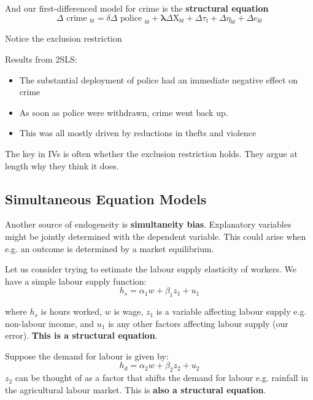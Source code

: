 \documentclass[11pt]{article}
\begin{document}
\begin{example}
And our first-differenced model for crime is the \textbf{structural equation}
\begin{equation}
\Delta \text { crime }_{b t}=\delta \Delta \text { police }_{b t}+\boldsymbol{\lambda} \Delta \mathrm{X}_{b t}+\Delta \tau_t+\Delta \eta_{b t}+\Delta e_{b t}
\end{equation}
\begin{note}
    Notice the exclusion restriction
\end{note}

Results from 2SLS:

\begin{itemize}
    \item The substantial deployment of police had an immediate negative effect on crime
    \item As soon as police were withdrawn, crime went back up.
    \item This was all mostly driven by reductions in thefts and violence
\end{itemize}

The key in IVs is often whether the exclusion restriction holds. They argue at length why they think it does.
\end{example}

\subsection{Simultaneous Equation Models}

Another source of endogeneity is \textbf{simultaneity bias}. Explanatory variables might be jointly determined with the dependent variable. This could arise when e.g. an outcome is determined by a market equilibrium.

Let us consider trying to estimate the labour supply elasticity of workers. We have a simple labour supply function:
\begin{equation}
    \label{sem simple labour supply}
    h_s = \alpha_1 w + \beta_1 z_1 + u_1
\end{equation}

where $h_s$ is hours worked, $w$ is wage, $z_1$ is a variable affecting labour supply e.g. non-labour income, and $u_1$ is any other factors affecting labour supply (our error). \textbf{This is a structural equation}.

Suppose the demand for labour is given by:
\begin{equation}
    \label{sem simple labour demand}
    h_d = \alpha_2 w + \beta_2 z_2 + u_2
\end{equation}
$z_2$ can be thought of as a factor that shifts the demand for labour e.g. rainfall in the agricultural labour market. This is \textbf{also a structural equation}.
\end{document}
